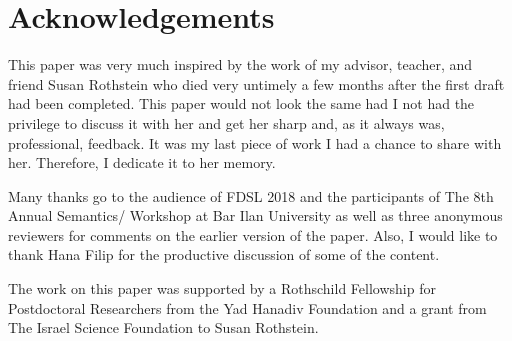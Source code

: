 \documentclass[output=paper,
colorlinks,
citecolor=brown,
newtxmath
]{langscibook}
\begin{document}
\section*{Acknowledgements}
This paper was very much inspired by the work of my advisor, teacher, and friend Susan Rothstein who died very untimely a few months after the first draft had been completed. This paper would not look the same had I not had the privilege to discuss it with her and get her sharp and, as it always was, professional, feedback. It was my last piece of work I had a chance to share with her. Therefore, I dedicate it to her memory.

Many thanks go to the audience of FDSL 2018 and the participants of The 8th Annual Semantics/ Workshop at Bar Ilan University as well as three anonymous reviewers for comments on the earlier version of the paper. Also, I would like to thank Hana Filip for the productive discussion of some of the content.

The work on this paper was supported by a Rothschild Fellowship for Postdoctoral Researchers from the Yad Hanadiv Foundation and a grant from The Israel Science Foundation to Susan Rothstein.

\sloppy
\printbibliography[heading=subbibliography,notkeyword=this]
\end{document}
